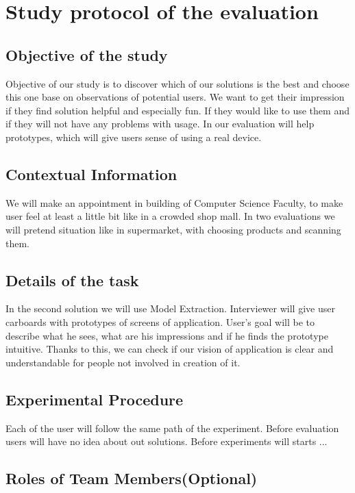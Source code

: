 \begingroup
\let\clearpage\relax
	\chapter{Study protocol of the evaluation}
\endgroup


\section{Objective of the study}
Objective of our study is to discover which of our solutions is the best and choose this one base on observations of potential users. We want to get their impression if they find solution helpful and especially fun. If they would like to use them and if they will not have any problems with usage. In our evaluation will help prototypes, which will give users sense of using a real device.



\section{Contextual Information}
We will make an appointment in building of Computer Science Faculty, to make user feel at least a little bit like in a crowded shop mall. In two evaluations we will pretend situation like in supermarket, with choosing products and scanning them. 


\section{Details of the task}
In the second solution we will use Model Extraction. Interviewer will give user carboards with prototypes of screens of application. User's goal will be to describe what he sees, what are his impressions and if he finds the prototype intuitive. Thanks to this, we can check if our vision of application is clear and understandable for people not involved in creation of it.

\section{Experimental Procedure}
Each of the user will follow the same path of the experiment. Before evaluation users will have no idea about out solutions. Before experiments will starts ...

\section{Roles of Team Members(Optional)}

